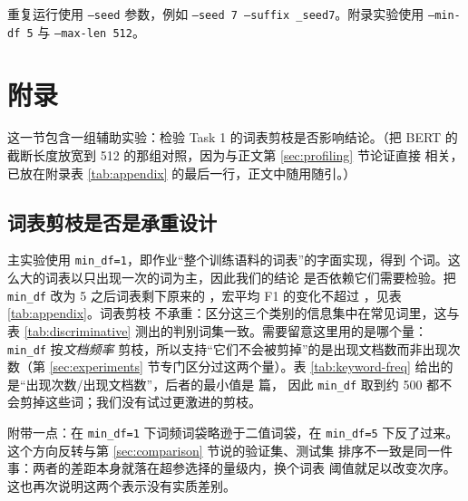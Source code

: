 \documentclass[11pt]{article}
\newcommand{\code}[1]{\texttt{\small #1}}
\begin{document}
重复运行使用 \code{--seed} 参数，例如
\code{--seed 7 --suffix \_seed7}。附录实验使用 \code{--min-df 5} 与
\code{--max-len 512}。

\appendix
\section{附录}\label{sec:appendix}

这一节包含一组辅助实验：检验 Task 1 的词表剪枝是否影响结论。（把 BERT 的
截断长度放宽到 512 的那组对照，因为与正文第 \ref{sec:profiling} 节论证直接
相关，已放在附录表 \ref{tab:appendix} 的最后一行，正文中随用随引。）

\subsection{词表剪枝是否是承重设计}

主实验使用 \code{min\_df=1}，即作业``整个训练语料的词表''的字面实现，得到
\resultVocabSize{} 个词。这么大的词表以只出现一次的词为主，因此我们的结论
是否依赖它们需要检验。把 \code{min\_df} 改为 5 之后词表剩下原来的 \resultVocabShrink{}，宏平均 F1 的变化不超过 \resultMinDfMaxDelta{}，见表 \ref{tab:appendix}。词表剪枝
不承重：区分这三个类别的信息集中在常见词里，这与表 \ref{tab:discriminative}
测出的判别词集一致。需要留意这里用的是哪个量：\code{min\_df} 按\emph{文档频率}
剪枝，所以支持``它们不会被剪掉''的是出现文档数而非出现次数（第
\ref{sec:experiments} 节专门区分过这两个量）。表 \ref{tab:keyword-freq} 给出的是``出现次数/出现文档数''，后者的最小值是 \resultMinKeywordDocFreq{} 篇，
因此 \code{min\_df} 取到约 500 都不会剪掉这些词；我们没有试过更激进的剪枝。

附带一点：在 \code{min\_df=1} 下词频词袋略逊于二值词袋，在 \code{min\_df=5}
下反了过来。这个方向反转与第 \ref{sec:comparison} 节说的验证集、测试集
排序不一致是同一件事：两者的差距本身就落在超参选择的量级内，换个词表
阈值就足以改变次序。这也再次说明这两个表示没有实质差别。




\end{document}
